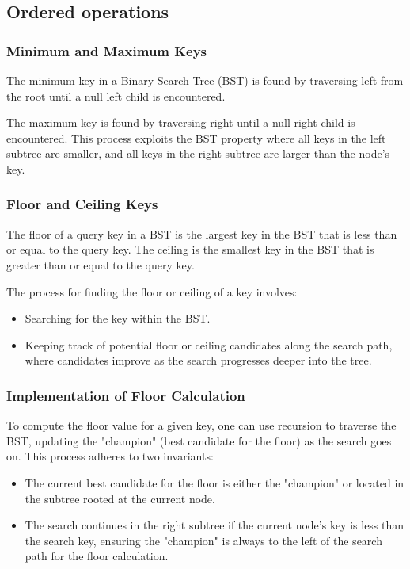 \documentclass{article}
\begin{document}
\subsection{Ordered operations}

\subsubsection{Minimum and Maximum Keys}
The minimum key in a Binary Search Tree (BST) is found by traversing left from the root until a null left child is encountered. 

The maximum key is found by traversing right until a null right child is encountered. This process exploits the BST property where all keys in the left subtree are smaller, and all keys in the right subtree are larger than the node's key.

\subsubsection{Floor and Ceiling Keys}
The floor of a query key in a BST is the largest key in the BST that is less than or equal to the query key. The ceiling is the smallest key in the BST that is greater than or equal to the query key.

The process for finding the floor or ceiling of a key involves:
\begin{itemize}
    \item Searching for the key within the BST.
    \item Keeping track of potential floor or ceiling candidates along the search path, where candidates improve as the search progresses deeper into the tree.
\end{itemize}

\subsubsection{Implementation of Floor Calculation}

To compute the floor value for a given key, one can use recursion to traverse the BST, updating the "champion" (best candidate for the floor) as the search goes on. This process adheres to two invariants: 

\begin{itemize}
    \item The current best candidate for the floor is either the "champion" or located in the subtree rooted at the current node.
    \item The search continues in the right subtree if the current node's key is less than the search key, ensuring the "champion" is always to the left of the search path for the floor calculation.
\end{itemize}
\end{document}
